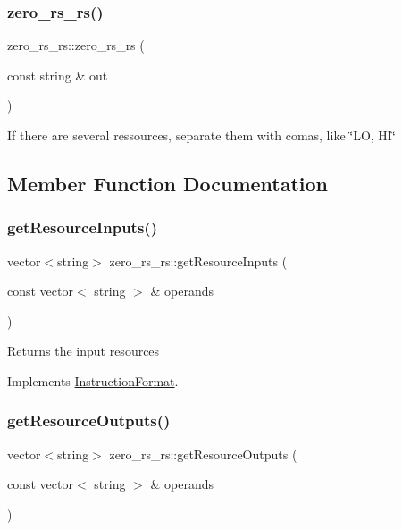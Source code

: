 \subsubsection{\texorpdfstring{zero\+\_\+rs\+\_\+rs()}{zero\_rs\_rs()}}
{\footnotesize\ttfamily zero\+\_\+rs\+\_\+rs\+::zero\+\_\+rs\+\_\+rs (\begin{DoxyParamCaption}\item[{const string \&}]{out }\end{DoxyParamCaption})}

If there are several ressources, separate them with comas, like \char`\"{}\+L\+O, H\+I\char`\"{} 

\subsection{Member Function Documentation}
\mbox{\label{classzero__rs__rs_a697c00ba542cb6f8f610dce7501ecab5}} 
\subsubsection{\texorpdfstring{get\+Resource\+Inputs()}{getResourceInputs()}}
{\footnotesize\ttfamily vector$<$string$>$ zero\+\_\+rs\+\_\+rs\+::get\+Resource\+Inputs (\begin{DoxyParamCaption}\item[{const vector$<$ string $>$ \&}]{operands }\end{DoxyParamCaption})\hspace{0.3cm}{\ttfamily [virtual]}}

Returns the input resources 

Implements \hyperlink{classInstructionFormat_a09775d3a3c22f40a0f44504664e586e4}{Instruction\+Format}.

\mbox{\label{classzero__rs__rs_a8700492ca6deb31a550493e267468c4c}} 
\subsubsection{\texorpdfstring{get\+Resource\+Outputs()}{getResourceOutputs()}}
{\footnotesize\ttfamily vector$<$string$>$ zero\+\_\+rs\+\_\+rs\+::get\+Resource\+Outputs (\begin{DoxyParamCaption}\item[{const vector$<$ string $>$ \&}]{operands }\end{DoxyParamCaption})\hspace{0.3cm}{\ttfamily [virtual]}}

